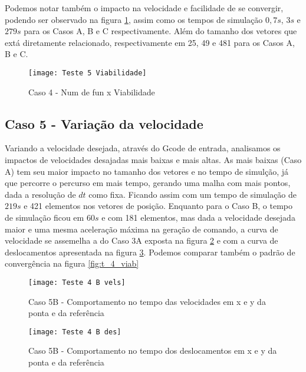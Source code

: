 Podemos notar também o impacto na velocidade e facilidade de se convergir, podendo ser observado na figura \ref{fig:t_5_viab}, assim
como os tempos de simulação $0,7 s$, $3 s$ e $279 s$ para os Casos A, B e C respectivamente. Além do tamanho dos vetores que extá diretamente relacionado,
respectivamente em 25, 49 e 481 para os Casos A, B e C.

\begin{figure}[H]
    \begin{center}
    \caption{Caso 4 - Num de fun x Viabilidade}
    \texttt{[image: Teste 5 Viabilidade]}
    \label{fig:t_5_viab}
    \end{center}
\end{figure}

\subsection{Caso 5 - Variação da velocidade}
Variando a velocidade desejada, através do Gcode de entrada, analisamos os impactos de velocidades desajadas mais baixas e mais altas.
As mais baixas (Caso A) tem seu maior impacto no tamanho dos vetores e no tempo de simulção, já que percorre o percurso em mais tempo,
gerando uma malha com mais pontos, dada a resolução de $dt$ como fixa. Ficando assim com um tempo de simulação de $219 s$ e 421 elementos nos vetores de posição.
Enquanto para o Caso B, o tempo de simulação ficou em $60 s$ e com 181 elementos, mas dada a velocidade desejada maior e uma mesma aceleração máxima
na geração de comando, a curva de velocidade se assemelha a do Caso 3A exposta na figura \ref{fig:t_4b_vels} e com a curva de deslocamentos apresentada na figura \ref{fig:t_4b_des}.
Podemos comparar também o padrão de convergência na figura \ref{fig:t_4_viab}

\begin{figure}[H]
    \begin{center}
    \caption{Caso 5B - Comportamento no tempo das velocidades em x e y da ponta e da referência}
    \texttt{[image: Teste 4 B vels]}
    \label{fig:t_4b_vels}
    \end{center}
\end{figure}

\begin{figure}[H]
    \begin{center}
    \caption{Caso 5B - Comportamento no tempo dos deslocamentos em x e y da ponta e da referência}
    \texttt{[image: Teste 4 B des]}
    \label{fig:t_4b_des}
    \end{center}
\end{figure}

